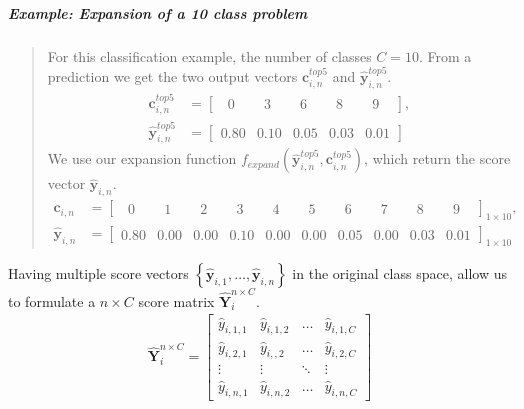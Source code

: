 \subparagraph{Example: Expansion of a 10 class problem} 
\blockquote[]{	 	
	For this classification example, the number of classes $C=10$. From a prediction we get the two output vectors $\bm{c}_{i,n}^{top5}$ and $ \bm{\hat{y}}_{i,n}^{top5}$.
	\begin{align*}
	\mathbf{c}_{i,n}^{top5} &= \begin{bmatrix}
	\phantom{0}0\phantom{.0} & \phantom{0}3\phantom{.0} & \phantom{0}6\phantom{.0} & \phantom{0}8\phantom{.0} & \phantom{0}9\phantom{.0}
	\end{bmatrix},\\
	\bm{\hat{y}}_{i,n}^{top5} &= \begin{bmatrix}
	0.80 & 0.10 & 0.05 & 0.03 & 0.01
	\end{bmatrix}
	\end{align*}
	We use our expansion function $ f_{expand}\left(\bm{\hat{y}}_{i,n}^{top5},\mathbf{c}_{i,n}^{top5}\right) $, which return the score vector $ \mathbf{\hat{y}}_{i,n}$.
	\begin{align*}
	\mathbf{c}_{i,n} &= \begin{bmatrix}
	\phantom{0}0\phantom{.0} & \phantom{0}1\phantom{.0} & \phantom{0}2\phantom{.0} & \phantom{0}3\phantom{.0} & \phantom{0}4\phantom{.0} & \phantom{0}5\phantom{.0} & \phantom{0}6\phantom{.0} & \phantom{0}7\phantom{.0} & \phantom{0}8\phantom{.0} & \phantom{0}9\phantom{.0}
	\end{bmatrix}_{1 \times 10},\\
	\mathbf{\hat{y}}_{i,n}  &= \begin{bmatrix}
	0.80 & 0.00 & 0.00 & 0.10 & 0.00 & 0.00 & 0.05 & 0.00 & 0.03 & 0.01
	\end{bmatrix}_{1 \times 10}
	\end{align*}
}      

Having multiple score vectors $ \left\{\bm{\hat{y}}_{i,1}, \dots, \bm{\hat{y}}_{i,n}\right\}  $ in the original class space, allow us to formulate a $ n \times C $ score matrix $ \bm{\hat{Y}}_{i}^{n \times C} $.
\begin{align}
	\bm{\hat{Y}}_{i}^{n \times C} =
	\begin{bmatrix}
		\hat{y}_{i,1,1} & \hat{y}_{i,1,2} & \dots & \hat{y}_{i,1,C} \\
		\hat{y}_{i,2,1} & \hat{y}_{i,,2} & \dots & \hat{y}_{i,2,C} \\
		\vdots & \vdots & \ddots & \vdots \\
		\hat{y}_{i,n,1} & \hat{y}_{i,n,2} & \dots & \hat{y}_{i,n,C}
	\end{bmatrix}
\end{align}

